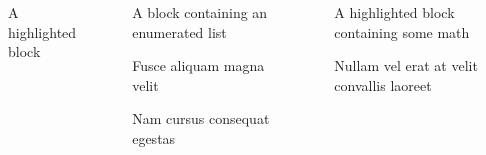 \documentclass[final]{beamer}
\newlength{\sepwidth}
\newlength{\colwidth}
\newcommand{\separatorcolumn}{\begin{column}{\sepwidth}\end{column}}
\begin{document}
\begin{frame}[t]
\begin{columns}[t]
\begin{column}{\colwidth}
\begin{block}{A highlighted block}
  \end{block}

\end{column}

\separatorcolumn

\begin{column}{\colwidth}

  \begin{block}{A block containing an enumerated list}

    
  \end{block}

  \begin{block}{Fusce aliquam magna velit}


  \end{block}

  \begin{block}{Nam cursus consequat egestas}

  \end{block}

\end{column}

\separatorcolumn

\begin{column}{\colwidth}

  \begin{exampleblock}{A highlighted block containing some math}

    

    


    

  \end{exampleblock}

  \begin{block}{Nullam vel erat at velit convallis laoreet}


\end{block}
\end{column}
\end{columns}
\end{frame}
\end{document}
